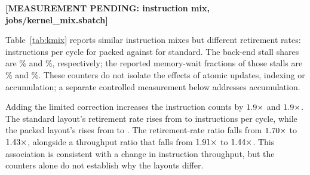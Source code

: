 \documentclass[sigconf,nonacm]{acmart}
\newcommand{\inputifready}[2]{%
  \IfFileExists{#1.tex}{}%
    {\textbf{[MEASUREMENT PENDING: #2]}}}
\begin{document}
\begin{table}[t]
  \centering
  \caption{Where the residual sweep's issued instructions go, and how fast they retire,
    $n=128$ on 72 threads, for both convective schemes. Both layouts are lane-blocked and call
    the same element kernel, so the mixes are comparable; written scalar, the standard layout's
    vector share is \SI{0.1}{\percent} and the table measures the implementation rather than the
    format.}
  \label{tab:kmix}
  \footnotesize
  \inputifready{tables/kmix}{instruction mix, jobs/kernel\_mix.sbatch}
\end{table}

Table~\ref{tab:kmix} reports similar instruction mixes but different retirement rates:
\kmixIpcPacked{} instructions per cycle for packed against \kmixIpcAtomic{} for standard.
The back-end stall shares are \kmixStallPctPacked\% and \kmixStallPctAtomic\%, respectively;
the reported memory-wait fractions of those stalls are \kmixStallMemPctPacked\% and
\kmixStallMemPctAtomic\%. These counters do not isolate the effects of atomic updates,
indexing or accumulation; a separate controlled measurement below addresses accumulation.

Adding the limited correction increases the instruction counts by
$1.9\times$ and $1.9\times$. The standard layout's
retirement rate rises from \kmixIpcAtomic{} to \kmixIpcAtomicHo{} instructions per cycle,
while the packed layout's rises from \kmixIpcPacked{} to \kmixIpcPackedHo{}.
The retirement-rate ratio falls from $1.70\times$ to $1.43\times$,
alongside a throughput ratio that falls from $1.91\times$ to $1.44\times$.
This association is consistent with a change in instruction throughput, but the counters
alone do not establish why the layouts differ.

\begin{table}[t]
  \centering
  \caption{Steady affine FP64 interior residual accumulation on Grace, with Rhie--Chow,
    $n=\scatterN$ and pack size \scatterPackSize{}. Times are milliseconds per sweep:
    normal execution $t_0$, full probe $t_+$, and bypass $t_-$.
    Each mean uses \scatterSamples{} samples of \scatterRepeat{} sweeps, with
    \scatterWarmup{} warmups per mode. All six mode orders occur twice.
    $\Delta=t_+-t_-$; brackets give the range of paired differences, not a confidence
    interval. The last columns give $100\Delta/t_+$ and $100(t_+/t_0-1)$.}
  \label{tab:scatter}
  \footnotesize
  \setlength{\tabcolsep}{3pt}
  
\end{table}
\end{document}
